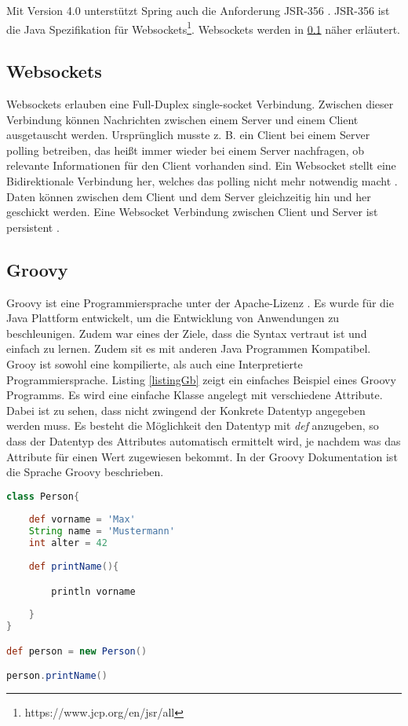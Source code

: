 Mit Version 4.0 unterstützt Spring auch die Anforderung JSR-356 \cite[Seite 14]{iuliana2017}. JSR-356 ist die Java Spezifikation für Websockets\footnote{https://www.jcp.org/en/jsr/all}. Websockets werden in \ref{websocket} näher erläutert.

\subsection{Websockets}\label{websocket}

Websockets erlauben eine Full-Duplex single-socket Verbindung. Zwischen dieser Verbindung können Nachrichten zwischen einem Server und einem Client ausgetauscht werden. 
Ursprünglich musste z. B. ein Client bei einem Server polling betreiben, das heißt immer wieder bei einem Server nachfragen, ob relevante Informationen für den Client vorhanden sind. Ein Websocket stellt eine Bidirektionale Verbindung her, welches das polling nicht mehr notwendig macht \cite[Seite 751f]{iuliana2017}. Daten können zwischen dem Client und dem Server gleichzeitig hin und her geschickt werden. Eine Websocket Verbindung zwischen Client und Server ist persistent \cite{malte2017}. 

\subsection{Groovy}

Groovy ist eine Programmiersprache unter der Apache-Lizenz \cite{groovy2017}.
Es wurde für die Java Plattform entwickelt, um die Entwicklung von Anwendungen zu beschleunigen. Zudem war eines der Ziele, dass die Syntax vertraut ist und einfach zu lernen. Zudem sit es mit anderen Java Programmen Kompatibel. 
Grooy ist sowohl eine kompilierte, als auch eine Interpretierte Programmiersprache. 
Listing \ref{listingGb} zeigt ein einfaches Beispiel eines Groovy Programms. Es wird eine einfache Klasse angelegt mit verschiedene Attribute. Dabei ist zu sehen, dass nicht zwingend der Konkrete Datentyp angegeben werden muss. Es besteht die Möglichkeit den Datentyp mit \textit{def} anzugeben, so dass der Datentyp des Attributes automatisch ermittelt wird, je nachdem was das Attribute für einen Wert zugewiesen bekommt. 
In der Groovy Dokumentation \cite{groovylang2017} ist die Sprache Groovy beschrieben.

\begin{lstlisting}[language=Groovy,caption={Eine einfache Groovy Klasse}, label=listingGb]
class Person{ 
	
	def vorname = 'Max'
	String name = 'Mustermann'
	int alter = 42
	
	def printName(){

		println vorname
		
	}
}

def person = new Person()

person.printName()
\end{lstlisting}



